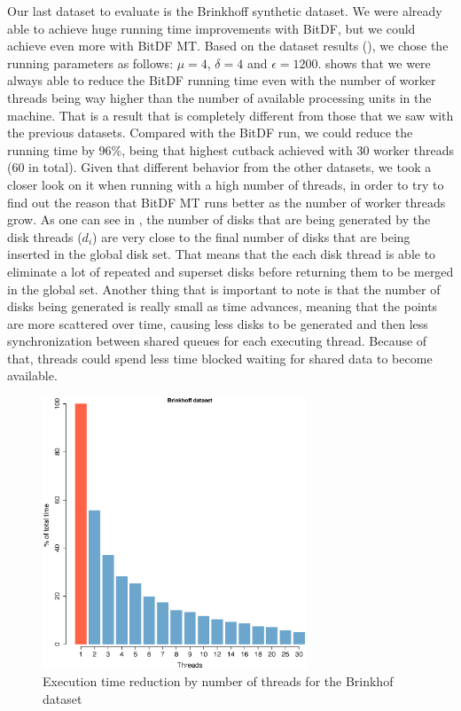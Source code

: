 {Our last dataset to evaluate is the Brinkhoff synthetic dataset. We were already able to achieve huge running time
improvements with BitDF, but we could achieve even more with BitDF MT. Based on the dataset results
(), we chose the running parameters as follows: $\mu=4$, $\delta=4$ and $\epsilon=1200$.
 shows that we were always able to reduce the BitDF running time even with the number of
worker threads being way higher than the number of available processing units in the machine. That is a result that is
completely different from those that we saw with the previous datasets. Compared with the BitDF run, we could reduce the
running time by 96\%, being that highest cutback achieved with 30 worker threads (60 in total). Given that different
behavior from the other datasets, we took a closer look on it when running with a high number of threads, in order to
try to find out the reason that BitDF MT runs better as the number of worker threads grow. As one can see in
, the number of disks that are being generated by the disk threads ($d_i$) are very
close to the final number of disks that are being inserted in the global disk set. That means that the each disk thread
is able to eliminate a lot of repeated and superset disks before returning them to be merged in the global set. Another
thing that is important to note is that the number of disks being generated is really small as time advances, meaning
that the points are more scattered over time, causing less disks to be generated and then less synchronization between
shared queues for each executing thread. Because of that, threads could spend less time blocked waiting for shared data
to become available.

\begin{figure}[h!]
    \centering
    \includegraphics[width=0.7\textwidth]{images/Brinkhoff_thread.eps}
    \caption{Execution time reduction by number of threads for the Brinkhof dataset}
    \label{fig:brinkhoff_threads}
\end{figure}

}

